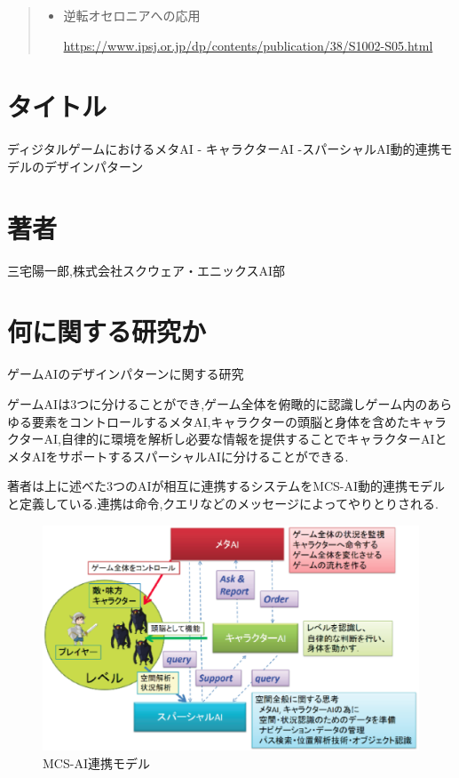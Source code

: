 \documentclass{jarticle}     %
\begin{document}
\begin{quote}
  \begin{itemize}
   \item 逆転オセロニアへの応用\par
   \url{https://www.ipsj.or.jp/dp/contents/publication/38/S1002-S05.html}
  \end{itemize}
 \end{quote}


 \section*{タイトル}
 ディジタルゲームにおけるメタAI - キャラクターAI -スパーシャルAI動的連携モデルのデザインパターン\cite{2}

\section*{著者}
三宅陽一郎,株式会社スクウェア・エニックスAI部

\section*{何に関する研究か}
ゲームAIのデザインパターンに関する研究\par
ゲームAIは3つに分けることができ,ゲーム全体を俯瞰的に認識しゲーム内のあらゆる要素をコントロールするメタAI,キャラクターの頭脳と身体を含めたキャラクターAI,自律的に環境を解析し必要な情報を提供することでキャラクターAIとメタAIをサポートするスパーシャルAIに分けることができる.\par
著者は上に述べた3つのAIが相互に連携するシステムをMCS-AI動的連携モデルと定義している.連携は命令,クエリなどのメッセージによってやりとりされる.
\par

\begin{figure}[ht]
  \centering
  \includegraphics[width=120mm]{assets/Figure3.eps}
  \caption{MCS-AI連携モデル}
  \label{fig:MCS-AI connect model}
\end{figure}
\end{document}
